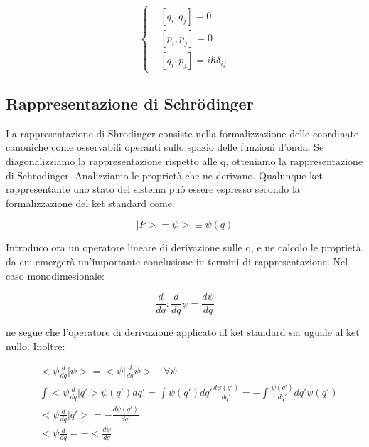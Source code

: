 \documentclass{article}
\begin{document}
\begin{equation}
    \left\{
    \begin{aligned}
         & [q_i, q_j]=0                  \\
         & [p_i, p_j]=0                  \\
         & [q_i, p_j]=i\hbar \delta_{ij}
    \end{aligned}
    \right.
\end{equation}

\subsection{Rappresentazione di Schrödinger}
La rappresentazione di Shrodinger consiste nella formalizzazione delle coordinate canoniche come osservabili operanti sullo spazio delle funzioni d'onda.
Se diagonalizziamo la rappresentazione rispetto alle q, otteniamo la rappresentazione di Schrodinger.
Analizziamo le proprietà che ne derivano.
Qualunque ket rappresentante uno stato del sistema può essere espresso secondo la formalizzazione del ket standard come:

\begin{equation}
    |P>= \psi>\equiv \psi(q)
\end{equation}

Introduco ora un operatore lineare di derivazione sulle q, e ne calcolo le proprietà, da cui emergerà un'importante conclusione in termini di rappresentazione.
Nel caso monodimesionale:

\begin{equation}
    \frac{d}{dq} : \frac{d}{dq} \psi = \frac{d \psi}{dq}
\end{equation}

ne segue che l'operatore di derivazione applicato al ket standard sia uguale al ket nullo.
Inoltre:

\begin{equation}
    \begin{aligned}
         & <\psi \frac{d}{dq} | \psi>= <\psi |\frac{d}{dq} \psi> \quad \forall \psi                                                  \\
         & \int <\psi \frac{d}{dq} | q'> \psi(q')dq'= \int \psi(q') dq' \frac{d\psi(q')}{dq'}=-\int \frac{\psi(q')}{dq'}dq' \psi(q') \\
         & <\psi \frac{d}{dq}|q'>=-\frac{d\psi(q')}{dq'}                                                                             \\
         & <\psi \frac{d}{dq} = -<\frac{d\psi}{dq}
    \end{aligned}
\end{equation}
\end{document}
